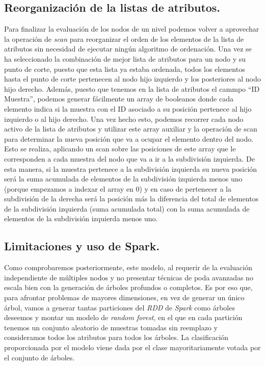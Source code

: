 \subsection{Reorganización de la listas de atributos.}
Para finalizar la evaluación de los nodos de un nivel podemos volver a aprovechar la operación de \textit{scan} para reorganizar el orden de los elementos de la lista de atributos sin necesidad de ejecutar ningún algoritmo de ordenación. Una vez se ha seleccionado la combinación de mejor lista de atributos para un nodo y su punto de corte, puesto que esta lista ya estaba ordenada, todos los elementos hasta el punto de corte pertenecen al nodo hijo izquierdo y los posteriores al nodo hijo derecho. Además, puesto que tenemos en la lista de atributos el cammpo ``ID Muestra'', podemos generar fácilmente un array de booleanos donde cada elemento indica si la muestra con el ID asociado a su posición pertenece al hijo izquierdo o al hijo derecho. Una vez hecho esto, podemos recorrer cada nodo activo de la lista de atributos y utilizar este array auxiliar y la operación de scan para determinar la nueva posición que va a ocupar el elemento dentro del nodo. Esto se realiza, aplicando un scan sobre las posiciones de este array que le corresponden a cada muestra del nodo que va a ir a la subdivisión izquierda. De esta manera, si la muestra pertenece a la subdivisión izquierda su nueva posición será la suma acumulada de elementos de la subdivisión izquierda menos uno (porque empezamos a indexar el array en 0) y en caso de pertenecer a la subdivisión de la derecha será la posición más la diferencia del total de elementos de la subdivisión izquierda (suma acumulada total) con la suma acumulada de elementos de la subdivisión izquierda menos uno.

\subsection{Limitaciones y uso de Spark.}
Como comprobaremos posteriormente, este modelo, al requerir de la evaluación independiente de múltiples nodos y no presentar técnicas de poda avanzadas no escala bien con la generación de árboles profundos o completos. Es por eso que, para afrontar problemas de mayores dimensiones, en vez de generar un único árbol, vamos a generar tantas particiones del \textit{RDD} de \textit{Spark} como árboles deseemos y montar un modelo de \textit{random forest}, en el que en cada partición tenemos un conjunto aleatorio de muestras tomadas sin reemplazo y consideramos todos los atributos para todos los árboles. La clasificación proporcionada por el modelo viene dada por el clase mayoritariamente votada por el conjunto de árboles.

